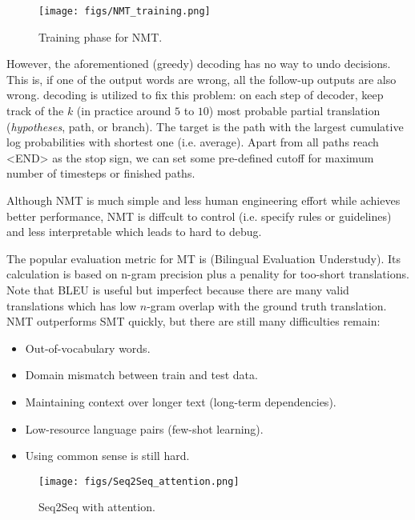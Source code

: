 \begin{figure}[!thp]
	\centerline{\texttt{[image: figs/NMT\_training.png]}}
	\caption{Training phase for NMT.}
	\label{fig:NMT_training}
\end{figure}

However, the aforementioned (greedy) decoding has no way to undo decisions. This is, if one of the output words are wrong, all the follow-up outputs are also wrong.
 decoding is utilized to fix this problem: on each step of decoder, keep track of the $k$ (in practice around $5$ to $10$) most probable partial translation (\emph{hypotheses}, path, or branch).
The target is the path with the largest cumulative log probabilities with shortest one (i.e. average).
Apart from all paths reach <END> as the stop sign, we can set some pre-defined cutoff for maximum number of timesteps or finished paths.


Although NMT is much simple and less human engineering effort while achieves better performance, NMT is diffcult to control (i.e. specify rules or guidelines) and less interpretable which leads to hard to debug.

The popular evaluation metric for MT is  (Bilingual Evaluation Understudy).
Its calculation is based on n-gram precision plus a penality for too-short translations.
Note that BLEU is useful but imperfect because there are many valid translations which has low $n$-gram overlap with the ground truth translation.
NMT outperforms SMT quickly, but there are still many difficulties remain:
\begin{itemize}
	\item Out-of-vocabulary words.
	\item Domain mismatch between train and test data.
	\item Maintaining context over longer text (long-term dependencies).
	\item Low-resource language pairs (few-shot learning).
	\item Using common sense is still hard.
\end{itemize}

\begin{figure}[!thp]
	\centerline{\texttt{[image: figs/Seq2Seq\_attention.png]}}
	\caption{Seq2Seq with attention.}
	\label{fig:Seq2Seq_Attention}
\end{figure}

